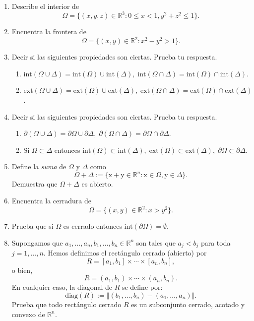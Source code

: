 \documentclass[12pt]{article}
\newcommand{\norm}[1]{\left\Vert#1\right\Vert}
\newcommand{\diag}{\mathrm{diag}}
\newcommand{\Ext}{\mathrm{ext}}
\newcommand{\Int}{\mathrm{int}}
\newcommand{\R}{\mathbb R}
\newcommand{\x}{\mathrm x}
\newcommand{\y}{\mathrm y}
\begin{document}
\begin{enumerate}
\item Describe el interior de
\[ \Omega = \{ (x,y,z)\in \R^3 : 0\leq x < 1, y^2+z^2\leq 1\}. \]

\item Encuentra la frontera de 
\[ \Omega = \{ (x,y)\in \R^2 : x^2 - y^2 > 1 \}. \]

\item Decir si las siguientes propiedades son ciertas. Prueba tu respuesta.
\begin{enumerate}[(1)]
\item $\Int(\Omega\cup \Delta) = \Int(\Omega)\cup \Int(\Delta),\; \Int(\Omega\cap \Delta) = \Int(\Omega)\cap \Int(\Delta)$.
\item $\Ext(\Omega\cup \Delta) = \Ext(\Omega)\cup \Ext(\Delta),\; \Ext(\Omega\cap \Delta) = \Ext(\Omega)\cap \Ext(\Delta)$.
\end{enumerate}

\item Decir si las siguientes propiedades son ciertas. Prueba tu respuesta.
\begin{enumerate}[(1)]
\item $\partial(\Omega\cup \Delta) = \partial \Omega\cup \partial \Delta,\; 
\partial(\Omega\cap \Delta) = \partial \Omega\cap \partial \Delta$.
\item Si $\Omega\subset \Delta$ entonces $\Int(\Omega)\subset \Int(\Delta),\; \Ext(\Omega)\subset \Ext(\Delta),\; \partial \Omega\subset \partial \Delta$.
\end{enumerate}

\item Define la \emph{suma} de $\Omega$ y $\Delta$ como
\[ \Omega + \Delta := \{ \x+\y\in \R^n : \x\in \Omega, \y\in \Delta \}. \]
Demuestra que $\Omega + \Delta$ es abierto.

\item Encuentra la cerradura de 
\[ \Omega = \{ (x,y)\in \R^2 : x > y^2 \}. \]

\item Prueba que si $\Omega$ es cerrado entonces 
$\Int(\partial \Omega)=\emptyset$.

\item Supongamos que $a_1,\ldots,a_n,b_1,\ldots,b_n\in \R^n$ son tales que $a_j<b_j$ para toda $j=1,\ldots,n$. Hemos definimos el rectángulo cerrado (abierto) por
\[ R = [a_1,b_1]\times \cdots\times [a_n,b_n], \]
o bien,
\[ R = (a_1,b_1)\times \cdots\times (a_n,b_n). \]
En cualquier caso, la \textsf{diagonal} de $R$ se define por:
\[ \diag(R) := \norm{(b_1,\ldots,b_n) - (a_1,\ldots,a_n)}. \]
Prueba que todo rectángulo cerrado $R$ es un subconjunto cerrado, acotado y convexo de $\R^n$. 

\end{enumerate}
\end{document}
